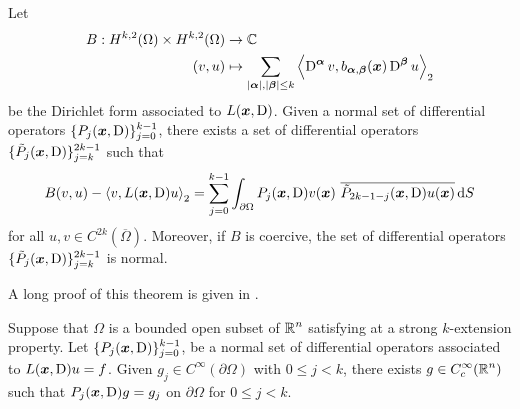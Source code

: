 \begin{theorem}
Let
\begin{equation} \label{ell_adj_BCs}
\begin{split}
B : H^{k,2}(\Omega) \times H^{k,2}(\Omega) & \rightarrow \mathbb{C} \\
(v,u) &\mapsto
\sum_{|{\bm{\alpha}}|,|{\bm{\beta}}|\leq k}
\left\langle{\operatorname{D}^{{\bm{\alpha}}} v} , {b_{{\bm{\alpha}},{\bm{\beta}}}({\bm{x}})
\operatorname{D}^{{\bm{\beta}}} u}\right\rangle_2
\end{split}
\end{equation}
be the Dirichlet form associated to $L({\bm{x}},\operatorname{D})$.  Given a normal
set of differential operators
$\displaystyle \{ P_j({\bm{x}},\operatorname{D})\}_{j=0}^{k-1}$,
there exists a set of differential operators
$\displaystyle \{ \tilde{P}_j({\bm{x}},\operatorname{D}) \}_{j=k}^{2k-1}$ such that
\[
B(v,u) - \left\langle{v} , {L({\bm{x}},\operatorname{D})u}\right\rangle_2
= \sum_{j=0}^{k-1} \int_{\partial \Omega} P_j({\bm{x}},\operatorname{D})v({\bm{x}})
\ \overline{\tilde{P}_{2k-1-j}({\bm{x}},\operatorname{D})u({\bm{x}})} \,\mathrm{d}{S}
\]
for all $\displaystyle u,v \in C^{2k}(\overline{\Omega})$.
Moreover, if $B$ is coercive, the set of differential operators
$\displaystyle \{ \tilde{P}_j({\bm{x}},\operatorname{D}) \}_{j=k}^{2k-1}$ is normal.
\end{theorem}

A long proof of this theorem is given in \cite{FoPDE}.

\begin{theorem} \label{ell_normal_BCs}
Suppose that $\Omega$ is a bounded open subset of $\displaystyle \mathbb{R}^n$
satisfying at a strong $k$-extension property.
Let $\displaystyle \{ P_j({\bm{x}},\operatorname{D}) \}_{j=0}^{k-1}$, be a normal set of
differential operators associated to $L({\bm{x}},\operatorname{D})u=f$.  Given
$\displaystyle g_j\in C^\infty(\partial \Omega)$ with $0\leq j<k$, there
exists $\displaystyle g \in C^\infty_c(\mathbb{R}^n)$ such that
$P_j({\bm{x}},\operatorname{D})g=g_j$ on $\partial \Omega$ for $0\leq j<k$.
\end{theorem}

